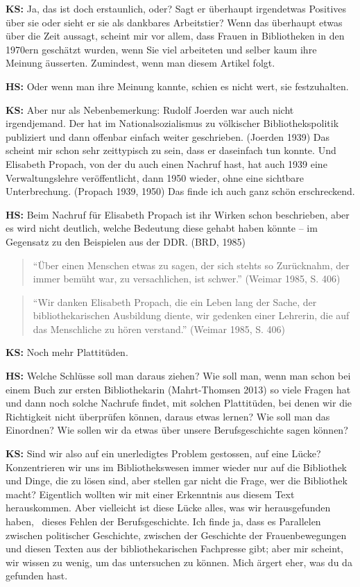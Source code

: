 \documentclass[a4paper,
fontsize=11pt,
oneside,
numbers=noperiodatend,
parskip=half-,
bibliography=totoc,
final
]{scrartcl}
\begin{document}
\textbf{KS:} Ja, das ist doch erstaunlich, oder? Sagt er überhaupt
irgendetwas Positives über sie oder sieht er sie als dankbares
Arbeitstier? Wenn das überhaupt etwas über die Zeit aussagt, scheint mir
vor allem, dass Frauen in Bibliotheken in den 1970ern geschätzt wurden,
wenn Sie viel arbeiteten und selber kaum ihre Meinung äusserten.
Zumindest, wenn man diesem Artikel folgt.

\textbf{HS:} Oder wenn man ihre Meinung kannte, schien es nicht wert,
sie festzuhalten.

\textbf{KS:} Aber nur als Nebenbemerkung: Rudolf Joerden war auch nicht
irgendjemand. Der hat im Nationalsozialismus zu völkischer
Bibliothekspolitik publiziert und dann offenbar einfach weiter
geschrieben. (Joerden 1939) Das scheint mir schon sehr zeittypisch zu
sein, dass er daseinfach tun konnte. Und Elisabeth Propach, von der du
auch einen Nachruf hast, hat auch 1939 eine Verwaltungslehre
veröffentlicht, dann 1950 wieder, ohne eine sichtbare Unterbrechung.
(Propach 1939, 1950) Das finde ich auch ganz schön erschreckend.

\textbf{HS:} Beim Nachruf für Elisabeth Propach ist ihr Wirken schon
beschrieben, aber es wird nicht deutlich, welche Bedeutung diese gehabt
haben könnte -- im Gegensatz zu den Beispielen aus der DDR. (BRD, 1985)

\begin{quote}
\enquote{Über einen Menschen etwas zu sagen, der sich stehts so
Zurücknahm, der immer bemüht war, zu versachlichen, ist schwer.} (Weimar
1985, S. 406)
\end{quote}

\begin{quote}
\enquote{Wir danken Elisabeth Propach, die ein Leben lang der Sache, der
bibliothekarischen Ausbildung diente, wir gedenken einer Lehrerin, die
auf das Menschliche zu hören verstand.} (Weimar 1985, S. 406)
\end{quote}

\textbf{KS:} Noch mehr Plattitüden.

\textbf{HS:} Welche Schlüsse soll man daraus ziehen? Wie soll man, wenn
man schon bei einem Buch zur ersten Bibliothekarin (Mahrt-Thomsen 2013)
so viele Fragen hat und dann noch solche Nachrufe findet, mit solchen
Plattitüden, bei denen wir die Richtigkeit nicht überprüfen können,
daraus etwas lernen? Wie soll man das Einordnen? Wie sollen wir da etwas
über unsere Berufsgeschichte sagen können?

\textbf{KS:} Sind wir also auf ein unerledigtes Problem gestossen, auf
eine Lücke? Konzentrieren wir uns im Bibliothekswesen immer wieder nur
auf die Bibliothek und Dinge, die zu lösen sind, aber stellen gar nicht
die Frage, wer die Bibliothek macht? Eigentlich wollten wir mit einer
Erkenntnis aus diesem Text herauskommen. Aber vielleicht ist diese Lücke
alles, was wir herausgefunden haben,~ dieses Fehlen der
Berufsgeschichte. Ich finde ja, dass es Parallelen zwischen politischer
Geschichte, zwischen der Geschichte der Frauenbewegungen und diesen
Texten aus der bibliothekarischen Fachpresse gibt; aber mir scheint, wir
wissen zu wenig, um das untersuchen zu können. Mich ärgert eher, was du
da gefunden hast.
\end{document}

